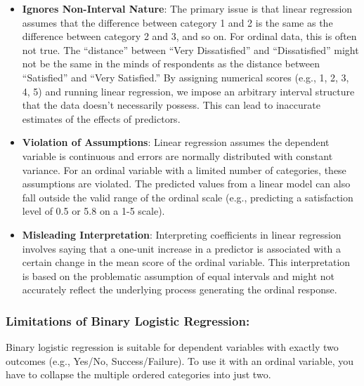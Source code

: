 \documentclass[
  letterpaper,
  DIV=11,
  numbers=noendperiod]{scrartcl}
\begin{document}
\begin{itemize}
\item
  \textbf{Ignores Non-Interval Nature}: The primary issue is that linear
  regression assumes that the difference between category 1 and 2 is the
  same as the difference between category 2 and 3, and so on. For
  ordinal data, this is often not true. The ``distance'' between ``Very
  Dissatisfied'' and ``Dissatisfied'' might not be the same in the minds
  of respondents as the distance between ``Satisfied'' and ``Very
  Satisfied.'' By assigning numerical scores (e.g., 1, 2, 3, 4, 5) and
  running linear regression, we impose an arbitrary interval structure
  that the data doesn't necessarily possess. This can lead to inaccurate
  estimates of the effects of predictors.
\item
  \textbf{Violation of Assumptions}: Linear regression assumes the
  dependent variable is continuous and errors are normally distributed
  with constant variance. For an ordinal variable with a limited number
  of categories, these assumptions are violated. The predicted values
  from a linear model can also fall outside the valid range of the
  ordinal scale (e.g., predicting a satisfaction level of 0.5 or 5.8 on
  a 1-5 scale).
\item
  \textbf{Misleading Interpretation}: Interpreting coefficients in
  linear regression involves saying that a one-unit increase in a
  predictor is associated with a certain change in the mean score of the
  ordinal variable. This interpretation is based on the problematic
  assumption of equal intervals and might not accurately reflect the
  underlying process generating the ordinal response.
\end{itemize}

\hypertarget{limitations-of-binary-logistic-regression}{%
\subsubsection*{Limitations of Binary Logistic
Regression:}\label{limitations-of-binary-logistic-regression}}

Binary logistic regression is suitable for dependent variables with
exactly two outcomes (e.g., Yes/No, Success/Failure). To use it with an
ordinal variable, you have to collapse the multiple ordered categories
into just two.
\end{document}
